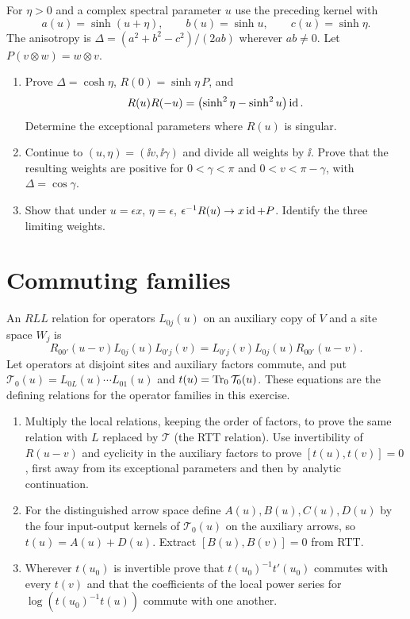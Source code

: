 \begin{exercise}
For $\eta>0$ and a complex spectral parameter $u$ use the preceding
kernel with
\[
 a(u)=\sinh(u+\eta),\qquad b(u)=\sinh u,\qquad c(u)=\sinh\eta.
\]
The anisotropy is $\Delta=(a^2+b^2-c^2)/(2ab)$ wherever $ab\ne0$.
Let $P(v\otimes w)=w\otimes v$.
\begin{enumerate}[label=(\alph*)]
\item Prove $\Delta=\cosh\eta$, $R(0)=\sinh\eta\,P$, and
\[
 R(u)R(-u)=\bigl(\sinh^2\eta-\sinh^2u\bigr)\operatorname{id}.
\]
Determine the exceptional parameters where $R(u)$ is singular.
\item Continue to $(u,\eta)=(\ii v,\ii\gamma)$ and divide all
weights by $\ii$. Prove that the resulting weights are positive for
$0<\gamma<\pi$ and $0<v<\pi-\gamma$, with $\Delta=\cos\gamma$.
\item Show that under $u=\epsilon x$, $\eta=\epsilon$,
$\epsilon^{-1}R(u)\to x\operatorname{id}+P$. Identify the three limiting weights.
\end{enumerate}
\end{exercise}

\section{Commuting families}

\begin{exercise}
An $RLL$ relation for operators $L_{0j}(u)$ on an auxiliary copy of $V$
and a site space $W_j$ is
\[
 R_{00'}(u-v)L_{0j}(u)L_{0'j}(v)
 =L_{0'j}(v)L_{0j}(u)R_{00'}(u-v).
\]
Let operators at disjoint sites and auxiliary factors commute, and put
$\mathcal T_0(u)=L_{0L}(u)\cdots L_{01}(u)$ and
$t(u)=\operatorname{Tr}_0\mathcal T_0(u)$. These equations are the defining relations
for the operator families in this exercise.
\begin{enumerate}[label=(\alph*)]
\item Multiply the local relations, keeping the order of factors, to
prove the same relation with $L$ replaced by $\mathcal T$ (the RTT
relation). Use invertibility of $R(u-v)$ and cyclicity in the auxiliary
factors to prove $[t(u),t(v)]=0$, first away from its exceptional
parameters and then by analytic continuation.
\item For the distinguished arrow space define
$A(u),B(u),C(u),D(u)$ by the four input-output kernels of
$\mathcal T_0(u)$ on the auxiliary arrows, so $t(u)=A(u)+D(u)$.
Extract $[B(u),B(v)]=0$ from RTT.
\item Wherever $t(u_0)$ is invertible prove that
$t(u_0)^{-1}t'(u_0)$ commutes with every $t(v)$ and that the
coefficients of the local power series for
$\log(t(u_0)^{-1}t(u))$ commute with one another.
\end{enumerate}
\end{exercise}

